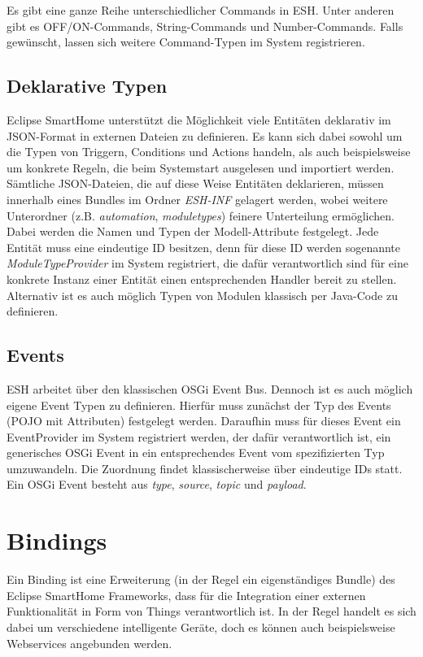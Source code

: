 Es gibt eine ganze Reihe unterschiedlicher Commands in ESH. Unter anderen gibt es OFF/ON-Commands, String-Commands und Number-Commands. Falls gewünscht, lassen sich weitere Command-Typen im System registrieren.


\subsection{Deklarative Typen}
\label{subsec:decltypes}
Eclipse SmartHome unterstützt die Möglichkeit viele Entitäten deklarativ im JSON-Format\cite{json} in externen Dateien zu definieren. Es kann sich dabei sowohl um die Typen von Triggern, Conditions und Actions handeln, als auch beispielsweise um konkrete Regeln, die beim Systemstart ausgelesen und importiert werden. Sämtliche JSON-Dateien, die auf diese Weise Entitäten deklarieren, müssen innerhalb eines Bundles im Ordner \textit{ESH-INF} gelagert werden, wobei weitere Unterordner (z.B. \textit{automation}, \textit{moduletypes}) feinere Unterteilung ermöglichen. \\

Dabei werden die Namen und Typen der Modell-Attribute festgelegt. Jede Entität muss eine eindeutige ID besitzen, denn für diese ID werden sogenannte \textit{ModuleTypeProvider} im System registriert, die dafür verantwortlich sind für eine konkrete Instanz einer Entität einen entsprechenden Handler bereit zu stellen.\\

Alternativ ist es auch möglich Typen von Modulen klassisch per Java-Code zu definieren.

\subsection{Events}
ESH arbeitet über den klassischen OSGi Event Bus. Dennoch ist es auch möglich eigene Event Typen zu definieren. Hierfür muss zunächst der Typ des Events (POJO mit Attributen) festgelegt werden. Daraufhin muss für dieses Event ein EventProvider im System registriert werden, der dafür verantwortlich ist, ein generisches OSGi Event in ein entsprechendes Event vom spezifizierten Typ umzuwandeln. Die Zuordnung findet klassischerweise über eindeutige IDs statt. Ein OSGi Event besteht aus \textit{type}, \textit{source}, \textit{topic} und \textit{payload}.


\section{Bindings}
\label{esh:bindings}
Ein Binding ist eine Erweiterung (in der Regel ein eigenständiges Bundle) des Eclipse SmartHome Frameworks, dass für die Integration einer externen Funktionalität in Form von Things verantwortlich ist. 
In der Regel handelt es sich dabei um verschiedene intelligente Geräte, doch es können auch beispielsweise Webservices angebunden werden.\\

